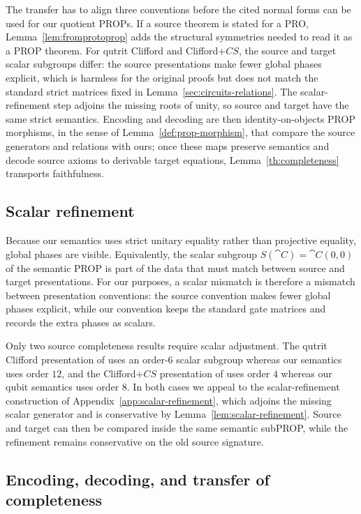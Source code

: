 \documentclass[10pt,a4paper]{article}
\def\cref#1{Lemma~\ref{#1}}%
\begin{document}
The transfer has to align three conventions before the cited normal forms can be used for our
quotient PROPs.  If a source theorem is stated for a PRO, \cref{lem:fromprotoprop} adds the
structural symmetries needed to read it as a PROP theorem.  For qutrit Clifford and
Clifford\(+CS\), the source and target scalar subgroups differ: the source presentations make fewer
global phases explicit, which is harmless for the original proofs but does not match the standard
strict matrices fixed in \cref{sec:circuits-relations}.  The scalar-refinement step adjoins the
missing roots of unity, so source and target have the same strict semantics.  Encoding and decoding
are then identity-on-objects PROP morphisms, in the sense of \cref{def:prop-morphism}, that compare
the source generators and relations with ours; once these maps preserve semantics and decode source
axioms to derivable target equations, \cref{th:completeness} transports faithfulness.

\subsection{Scalar refinement}
\label{subsec:scalar-refinement}

Because our semantics uses strict unitary equality rather than projective equality, global phases
are visible.  Equivalently, the scalar subgroup \(S(\cat{C})=\cat{C}(0,0)\) of the semantic PROP is
part of the data that must match between source and target presentations.
For our purposes, a scalar mismatch is therefore a mismatch between presentation conventions: the
source convention makes fewer global phases explicit, while our convention keeps the standard gate
matrices and records the extra phases as scalars.

Only two source completeness results require scalar adjustment.  The qutrit Clifford presentation of
\cite{qutritclifford} uses an order-\(6\) scalar subgroup whereas our semantics uses order \(12\), and
the Clifford\(+CS\) presentation of \cite{SelingerCliffordPlusCS} uses order \(4\) whereas our qubit
semantics uses order \(8\).  In both cases we appeal to the scalar-refinement construction of
Appendix~\ref{app:scalar-refinement}, which adjoins the missing scalar generator and is conservative
by \cref{lem:scalar-refinement}.  Source and target can then be compared inside the same semantic
subPROP, while the refinement remains conservative on the old source signature.

\subsection{Encoding, decoding, and transfer of completeness}
\end{document}
